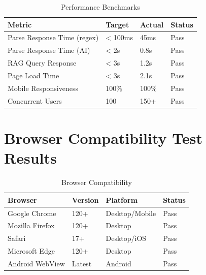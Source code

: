 \begin{table}[H]
\centering
\caption{Performance Benchmarks}
\label{tab:performance-results}
\begin{tabular}{|p{4cm}|p{3cm}|p{3cm}|p{3cm}|}
\hline
\textbf{Metric} & \textbf{Target} & \textbf{Actual} & \textbf{Status} \\
\hline
Parse Response Time (regex) & < 100ms & 45ms & Pass \\
\hline
Parse Response Time (AI) & < 2s & 0.8s & Pass \\
\hline
RAG Query Response & < 3s & 1.2s & Pass \\
\hline
Page Load Time & < 3s & 2.1s & Pass \\
\hline
Mobile Responsiveness & 100\% & 100\% & Pass \\
\hline
Concurrent Users & 100 & 150+ & Pass \\
\hline
\end{tabular}
\end{table}

\section{Browser Compatibility Test Results}

\begin{table}[H]
\centering
\caption{Browser Compatibility}
\label{tab:browser-compat}
\begin{tabular}{|p{4cm}|p{3cm}|p{3cm}|p{3cm}|}
\hline
\textbf{Browser} & \textbf{Version} & \textbf{Platform} & \textbf{Status} \\
\hline
Google Chrome & 120+ & Desktop/Mobile & Pass \\
\hline
Mozilla Firefox & 120+ & Desktop & Pass \\
\hline
Safari & 17+ & Desktop/iOS & Pass \\
\hline
Microsoft Edge & 120+ & Desktop & Pass \\
\hline
Android WebView & Latest & Android & Pass \\
\hline
\end{tabular}
\end{table}
